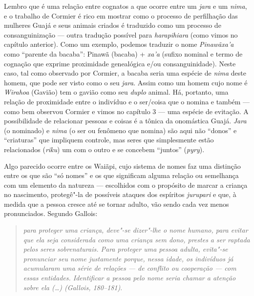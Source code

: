 Lembro que é uma relação entre cognatos a que ocorre entre um
\emph{jara} e um \emph{nima}, e o trabalho de Cormier é rico em mostrar
como o processo de perfilhação das mulheres Guajá e seus animais criados
é traduzido como um processo de consanguinização --- outra tradução
possível para \emph{harapihiara} (como vimos no capítulo anterior). Como
um exemplo, podemos traduzir o nome \emph{Pinawãxa'a} como ``parente da
bacaba'': Pinawã (bacaba) + \emph{xa'a} (sufixo nominal e termo de
cognação que exprime proximidade genealógica e/ou consanguinidade).
Neste caso, tal como observado por Cormier, a bacaba seria uma espécie
de \emph{nima} deste homem, que pode ser visto como o seu \emph{jara}.
Assim como um homem cujo nome é \emph{Wirahoa} (Gavião) tem o gavião
como seu \emph{duplo} animal. Há, portanto, uma relação de proximidade
entre o indivíduo e o ser/coisa que o nomina e também --- como bem
observou Cormier e vimos no capítulo 3 --- uma espécie de evitação. A
possibilidade de relacionar pessoas e coisas é a tônica da onomástica
Guajá. \emph{Jara} (o nominado) e \emph{nima} (o ser ou fenômeno que
nomina) são aqui não ``donos'' e ``criaturas'' que impliquem controle, mas
seres que simplesmente estão relacionados (\emph{riku}) um com o outro e
se concebem ``juntos'' (\emph{pyry}).

Algo parecido ocorre entre os Waiãpi, cujo sistema de nomes faz uma
distinção entre os que são ``só nomes'' e os que significam alguma relação
ou semelhança com um elemento da natureza --- escolhidos com o propósito
de marcar a criança no nascimento, protegê"-la de possíveis ataques dos
espíritos \emph{jurupari} e que, à medida que a pessoa cresce até se
tornar adulto, vão sendo cada vez menos pronunciados. Segundo Gallois:

\begin{quote}
\emph{para proteger uma criança, deve"-se dizer"-lhe o nome humano, para evitar
que ela seja considerada como uma criança sem dono, prestes a ser
raptada pelos seres sobrenaturais. Para proteger uma pessoa adulta,
evita"-se pronunciar seu nome justamente porque, nessa idade, os
indivíduos já acumularam uma série de relações --- de conflito ou
cooperação --- com essas entidades. Identificar a pessoa pelo nome seria
chamar a atenção sobre ela (\ldots{}) (Gallois, 180--181)}.
\end{quote}

